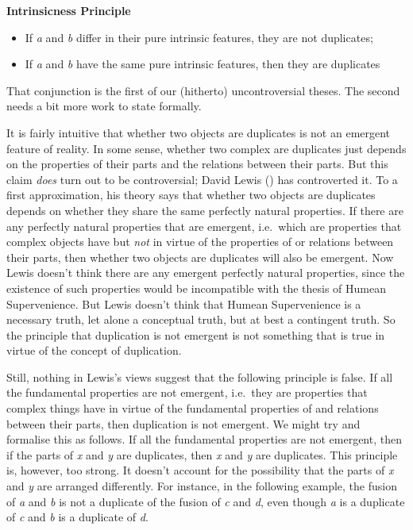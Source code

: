 \documentclass[
  10pt,
  letterpaper,
  DIV=11,
  numbers=noendperiod,
  twoside]{scrartcl}
\providecommand{\tightlist}{%
  \setlength{\itemsep}{0pt}\setlength{\parskip}{0pt}}\usepackage{longtable,booktabs,array}
\begin{document}
\textbf{Intrinsicness Principle}

\begin{itemize}
\tightlist
\item
  If \emph{a} and \emph{b} differ in their pure intrinsic features, they
  are not duplicates;
\item
  If \emph{a} and \emph{b} have the same pure intrinsic features, then
  they are duplicates
\end{itemize}

That conjunction is the first of our (hitherto) uncontroversial theses.
The second needs a bit more work to state formally.

It is fairly intuitive that whether two objects are duplicates is not an
emergent feature of reality. In some sense, whether two complex are
duplicates just depends on the properties of their parts and the
relations between their parts. But this claim \emph{does} turn out to be
controversial; David Lewis () has
controverted it. To a first approximation, his theory says that whether
two objects are duplicates depends on whether they share the same
perfectly natural properties. If there are any perfectly natural
properties that are emergent, i.e.~which are properties that complex
objects have but \emph{not} in virtue of the properties of or relations
between their parts, then whether two objects are duplicates will also
be emergent. Now Lewis doesn't think there are any emergent perfectly
natural properties, since the existence of such properties would be
incompatible with the thesis of Humean Supervenience. But Lewis doesn't
think that Humean Supervenience is a necessary truth, let alone a
conceptual truth, but at best a contingent truth. So the principle that
duplication is not emergent is not something that is true in virtue of
the concept of duplication.

Still, nothing in Lewis's views suggest that the following principle is
false. If all the fundamental properties are not emergent, i.e.~they are
properties that complex things have in virtue of the fundamental
properties of and relations between their parts, then duplication is not
emergent. We might try and formalise this as follows. If all the
fundamental properties are not emergent, then if the parts of \emph{x}
and \emph{y} are duplicates, then \emph{x} and \emph{y} are duplicates.
This principle is, however, too strong. It doesn't account for the
possibility that the parts of \emph{x} and \emph{y} are arranged
differently. For instance, in the following example, the fusion of
\emph{a} and \emph{b} is not a duplicate of the fusion of \emph{c} and
\emph{d}, even though \emph{a} is a duplicate of \emph{c} and \emph{b}
is a duplicate of \emph{d}.
\end{document}
